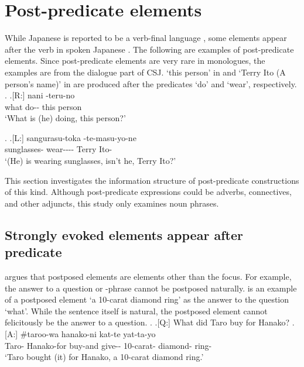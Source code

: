\section{Post-predicate elements}\label{WOPostPreEles}

While Japanese is reported to be a verb-final language \cite{hinds86,shibatani90},
some elements appear after the verb in spoken Japanese \cite{kuno78,onosuzuki92,fujii95,takami95a,takami95b,ono06,nakagawaetal08_paper}.
The following are examples of post-predicate elements.
Since post-predicate elements are very rare in monologues,
the examples are from the dialogue part of CSJ.
 `this person' in \Next and  `Terry Ito (A person's name)' in \NNext are produced after the predicates  `do' and  `wear', respectively.
%
\ex.
\ag.[R:] nani -teru-no   \\
 		what do-- this person \\
		`What is (he) doing, this person?'

\ex.\label{D02F0015_TerryIto}
 \ag.[L:] sangurasu-toka -te-masu-yo-ne   \\
		sunglasses- wear---\ab{fp}- Terry Ito- \\
		`(He) is wearing sunglasses, isn't he, Terry Ito?'

This section investigates the information structure of post-predicate constructions of this kind.
Although post-predicate expressions could be adverbs, connectives, and other adjuncts,
this study only examines noun phrases.

\subsection{Strongly evoked elements appear after predicate}\label{WORdis}

 argues that
postposed elements are elements other than the focus.
For example,
the answer to a question or -phrase cannot be postposed naturally.
\Next is an example of a postposed element `a 10-carat diamond ring' as the answer to the question `what'.
While the sentence itself is natural,
the postposed element cannot felicitously be the answer to a question.
%
\ex.
 \a.[Q:] What did Taro buy for Hanako?
 \bg.[A:] \#taroo-wa hanako-ni kat-te yat-ta-yo    \\
 		Taro- Hanako-for buy-and give-- 10-carat- diamond- ring- \\
		`Taro bought (it) for Hanako, a 10-carat diamond ring.'

